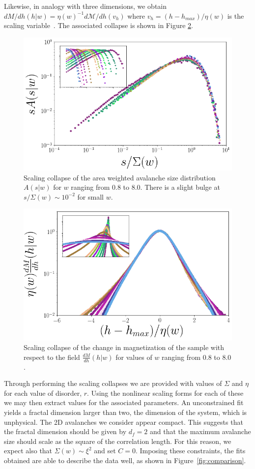 \documentclass[reprint,amsmath,amssymb,aps,floatfix, prl]{revtex4-1}
\begin{document}
%
Likewise, in analogy with three dimensions, we obtain $dM/dh(h|w)=\eta(w)^{-1} d\mathcal{M}/dh(v_h)$ where $v_h=(h-h_{max})/\eta(w)$ is the scaling variable~\cite{RFIM2Dsupp}. The associated collapse is shown in Figure \ref{fig:dMdh_collapse}.
%
\begin{figure}
	\includegraphics[scale=0.3]{A_collapse_inset.png}
  	\caption{Scaling collapse of the area weighted avalanche size distribution $A(s|w)$ for $w$ ranging from $0.8$ to $8.0$. There is a slight bulge at $s/\Sigma(w)\sim10^{-2}$ for small $w$.}
  	\label{fig:As_collapse}
\end{figure}
%
\begin{figure}
	\includegraphics[scale=0.3]{dMdh_collapse_inset.png}
  	\caption{ Scaling collapse of the change in magnetization of the sample with respect to the field $\frac{dM}{dh}(h|w)$ for values of $w$ ranging from $0.8$ to $8.0$. }
  	\label{fig:dMdh_collapse}
\end{figure}
%
Through performing the scaling collapses we are provided with values of $\Sigma$ and $\eta$ for each value of disorder, $r$.  Using the nonlinear scaling forms for each of these we may then extract values for the associated parameters. An unconstrained fit yields a fractal dimension larger than two, the dimension of the system, which is unphysical. The 2D avalanches we consider appear compact. This suggests that the fractal dimension should be given by $d_f=2$ and that the maximum avalanche size should scale as the square of the correlation length. For this reason, we expect also that $\Sigma(w)\sim\xi^2$ and set $C=0$. Imposing these constraints, the fits obtained are able to describe the data well, as shown in Figure~\ref{fig:comparison}.\par
\end{document}
